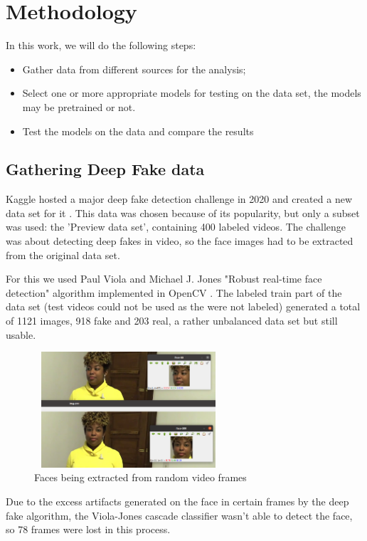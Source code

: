 \documentclass{bmvc2k}
\begin{document}
\section{Methodology}
\label{sec:depth}
In this work, we will do the following steps:

\begin{itemize}
  \item Gather data from different sources for the analysis;
  \item Select one or more appropriate models for testing on the data set, the models may be pretrained or not.
  \item Test the models on the data and compare the results
\end{itemize}

\subsection{Gathering Deep Fake data}

Kaggle hosted a major deep fake detection challenge in 2020 and created a new data set for it \cite{dolhansky2019deepfake}. This data was chosen because of its popularity, but only a subset was used:  the 'Preview data set', containing 400 labeled videos. The challenge was about detecting deep fakes in video, so the face images had to be extracted from the original data set.

For this we used Paul Viola and Michael J. Jones "Robust real-time face detection" algorithm implemented in OpenCV \cite{violajones04}. The labeled train part of the data set (test videos could not be used as the were not labeled) generated a total of 1121 images, 918 fake and 203 real, a rather unbalanced data set but still usable.

\begin{figure}[!h]
\centering
\includegraphics[width=7.0cm, height=4.3cm]{face-extraction.png}
    \caption{Faces being extracted from random video frames}
\end{figure}

Due to the excess artifacts generated on the face in certain frames by the deep fake algorithm, the Viola-Jones cascade classifier wasn't able to detect the face, so 78 frames were lost in this process.
\end{document}

